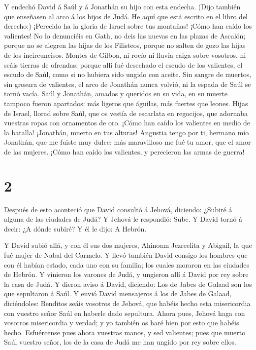  Y endechó David á Saúl y á Jonathán su hijo con esta
endecha.  (Dijo también que enseñasen al arco á los hijos
de Judá. He aquí que está escrito en el libro del derecho:)
 ¡Perecido ha la gloria de Israel sobre tus montañas! ¡Cómo
han caído los valientes!  No lo denunciéis en Gath, no deis
las nuevas en las plazas de Ascalón; porque no se alegren las hijas de
los Filisteos, porque no salten de gozo las hijas de los incircuncisos.
 Montes de Gilboa, ni rocío ni lluvia caiga sobre vosotros,
ni seáis tierras de ofrendas; porque allí fué desechado el escudo de los
valientes, el escudo de Saúl, como si no hubiera sido ungido con aceite.
 Sin sangre de muertos, sin grosura de valientes, el arco
de Jonathán nunca volvió, ni la espada de Saúl se tornó vacía.
 Saúl y Jonathán, amados y queridos en su vida, en su
muerte tampoco fueron apartados: más ligeros que águilas, más fuertes
que leones.  Hijas de Israel, llorad sobre Saúl, que os
vestía de escarlata en regocijos, que adornaba vuestras ropas con
ornamentos de oro.  ¡Cómo han caído los valientes en medio
de la batalla! ¡Jonathán, muerto en tus alturas!  Angustia
tengo por ti, hermano mío Jonathán, que me fuiste muy dulce: más
maravilloso me fué tu amor, que el amor de las mujeres. 
¡Cómo han caído los valientes, y perecieron las armas de guerra!

\hypertarget{section-1}{%
\section{2}\label{section-1}}

 Después de esto aconteció que David consultó á Jehová,
diciendo: ¿Subiré á alguna de las ciudades de Judá? Y Jehová le
respondió: Sube. Y David tornó á decir: ¿A dónde subiré? Y él le dijo: A
Hebrón.

 Y David subió allá, y con él sus dos mujeres, Ahinoam
Jezreelita y Abigail, la que fué mujer de Nabal del Carmelo.
 Y llevó también David consigo los hombres que con él habían
estado, cada uno con su familia; los cuales moraron en las ciudades de
Hebrón.  Y vinieron los varones de Judá, y ungieron allí á
David por rey sobre la casa de Judá. Y dieron aviso á David, diciendo:
Los de Jabes de Galaad son los que sepultaron á Saúl.  Y
envió David mensajeros á los de Jabes de Galaad, diciéndoles: Benditos
seáis vosotros de Jehová, que habéis hecho esta misericordia con vuestro
señor Saúl en haberle dado sepultura.  Ahora pues, Jehová
haga con vosotros misericordia y verdad; y yo también os haré bien por
esto que habéis hecho.  Esfuércense pues ahora vuestras
manos, y sed valientes; pues que muerto Saúl vuestro señor, los de la
casa de Judá me han ungido por rey sobre ellos.

